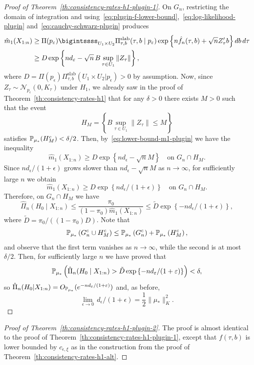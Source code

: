 \begin{proof}[Proof of Theorem~\ref{th:consistency-rates-h1-plugin-1}]
On \(G_n\), restricting the domain of integration and using~\eqref{eq:plugin-f-lower-bound},~\eqref{eq:log-likelihood-plugin} and~\eqref{eq:cauchy-schwarz-plugin} produces
\begin{equation}\label{eq:lower-bound-m1-plugin}
  \begin{split}
  \hat m_1(X_{1:n}) &\geq \Pi(p_\epsilon)\bigintssss_{U_1 \times U_2}\Pi_{\tau, b}^{\text{slab}}(\tau, b \mid p_\epsilon)\exp\left\{n\hat f_n(\tau,b)+\sqrt{n} Z_\tau'b\right\} db\,d\tau \\
  &\geq D\exp\left\{nd_\epsilon - \sqrt{n}\,B\sup_{\tau\in U_1}\|Z_\tau\|\right\},
  \end{split}
\end{equation}
where \(D=\Pi(p_\epsilon)\Pi_{\tau, b}^{\text{slab}}(U_1 \times U_2|p_{\epsilon})>0\) by assumption. Now, since \(Z_\tau \sim \mathcal N_{p_\epsilon}(0, K_\tau)\) under \(H_1\), we already saw in the proof of Theorem~\ref{th:consistency-rates-h1} that for any \(\delta>0\) there exists \(M>0\) such that the event
\[
H_M = \left\{B \sup_{\tau\in U_1}\|Z_\tau\| \leq M\right\}
\]
satisfies \(\mathbb{P}_{\mu_*}(H_M^c)<\delta/2\). Then, by~\eqref{eq:lower-bound-m1-plugin} we have the inequality 
\[
  \hat m_1(X_{1:n}) \geq D\exp\left\{nd_\epsilon - \sqrt{n}M\right \}\quad \text{on }G_n\cap H_M.
\]
Since \(nd_\epsilon/(1+\epsilon)\) grows slower than \(nd_\epsilon - \sqrt{n}M\) as \(n\to\infty\), for sufficiently large \(n\) we obtain 
\[
  \hat m_1(X_{1:n}) \geq D\exp\left\{n d_\epsilon/(1+\epsilon)\right\}\quad \text{on } G_n\cap H_M.
\]
Therefore, on \(G_n\cap H_M\) we have
\[
  \hat\Pi_n(H_0\mid X_{1:n}) \leq \frac{\pi_0}{(1-\pi_0)\hat m_1(X_{1:n})}\leq \tilde{D}\exp\left\{-nd_\epsilon/(1+\epsilon)\right\},
\]
where \(\tilde{D}=\pi_0/((1-\pi_0)D)\). Note that 
\[
  \mathbb{P}_{\mu_*}\left(G_n^c\cup H_M^c\right)\leq \mathbb{P}_{\mu_*}\left(G_n^c\right)+\mathbb{P}_{\mu_*}\left(H_M^c\right),
\]
and observe that the first term vanishes as \(n\to\infty\), while the second is at most \(\delta/2\). Then, for sufficiently large \(n\) we have proved that
\[
\mathbb{P}_{\mu_*}\left(\hat\Pi_n(H_0\mid X_{1:n})>\tilde{D}\exp\left\{-nd_\varepsilon/(1+\varepsilon)\right\}\right)<\delta,
\]
so \(\hat\Pi_n(H_0|X_{1:n})=O_{\mathbb{P}_{\mu_*}}(e^{-nd_\varepsilon/(1+\varepsilon)})\) and, as before, 
\[
  \lim_{\epsilon\to 0}\, d_\epsilon/(1+\epsilon)=\frac{1}{2}\|\mu_*\|_K^2.
\]
\end{proof}

\begin{proof}[Proof of Theorem~\ref{th:consistency-rates-h1-plugin-2}]\label{proof:consistency-rates-h1-plugin-2}
  The proof is almost identical to the proof of Theorem~\ref{th:consistency-rates-h1-plugin-1}, except that \(f(\tau,b)\) is lower bounded by \(c_{\epsilon,\xi}\) as in the construction from the proof of Theorem~\ref{th:consistency-rates-h1-alt}.
\end{proof}

